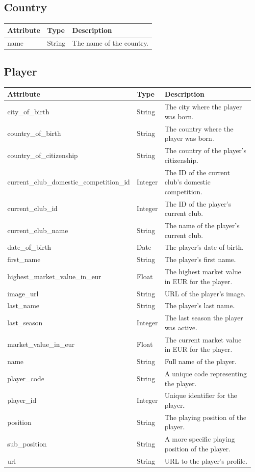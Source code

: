 \documentclass{Configuration_Files/PoliMi3i_thesis}
\begin{document}
\subsection*{Country}
\begin{longtable}{|p{4cm}|p{3cm}|p{8cm}|}
\hline
\textbf{Attribute} & \textbf{Type} & \textbf{Description} \\
\hline
\endhead
name & String & The name of the country. \\
\hline
\end{longtable}

\newpage

\subsection*{Player}
\begin{longtable}{|p{6.2cm}|p{1.6cm}|p{8cm}|}
\hline
\textbf{Attribute} & \textbf{Type} & \textbf{Description} \\
\hline
\endhead
city\_of\_birth & String & The city where the player was born. \\
country\_of\_birth & String & The country where the player was born. \\
country\_of\_citizenship & String & The country of the player's citizenship. \\
current\_club\_domestic\_competition\_id & Integer & The ID of the current club's domestic competition. \\
current\_club\_id & Integer & The ID of the player's current club. \\
current\_club\_name & String & The name of the player's current club. \\
date\_of\_birth & Date & The player's date of birth. \\
first\_name & String & The player's first name. \\
highest\_market\_value\_in\_eur & Float & The highest market value in EUR for the player. \\
image\_url & String & URL of the player's image. \\
last\_name & String & The player's last name. \\
last\_season & Integer & The last season the player was active. \\
market\_value\_in\_eur & Float & The current market value in EUR for the player. \\
name & String & Full name of the player. \\
player\_code & String & A unique code representing the player. \\
player\_id & Integer & Unique identifier for the player. \\
position & String & The playing position of the player. \\
sub\_position & String & A more specific playing position of the player. \\
url & String & URL to the player's profile. \\
\hline
\end{longtable}
\end{document}
